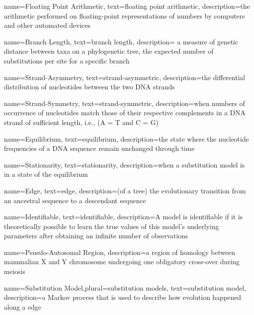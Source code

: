 \makeglossaries

{
        name=Floating Point Arithmetic,
        text=floating point arithmetic,
        description={the arithmetic performed on floating-point representations of numbers by computers and other automated devices}
}


{
        name=Branch Length,
        text=branch length,
        description={ a measure of genetic distance between taxa on a phylogenetic tree, the expected number of substitutions per site for a specific branch}
}


{
        name=Strand-Asymmetry,
        text={strand-asymmetric},
        description={the differential distribution of nucleotides between the two DNA strands}
}

{
        name=Strand-Symmetry,
        text=strand-symmetric,
        description={when numbers of occurrence of nucleotides match those of their respective complements in a DNA strand of sufficient length, i.e., (A = T and C = G)}
}


{
        name=Equilibrium,
        text=equilibrium,
        description={the state where the nucleotide frequencies of a DNA sequence remain unchanged through time}
}

{
        name=Stationarity,
        text=stationarity,
        description={when a substitution model is in a state of the \gls{equilibrium}}
}


{
        name=Edge,
        text=edge,
        description={(of a tree) the evolutionary transition from an ancestral sequence to a descendant sequence}
}

{
        name=Identifiable,
        text=identifiable,
        description={A model is identifiable if it is theoretically possible to learn the true values of this model's underlying parameters after obtaining an infinite number of observations}
}

{
        name=Psuedo-Autosomal Region,
        description={a region of homology between mammalian X and Y chromosome undergoing one obligatory cross-over during meiosis}
}

{
        name={Substitution Model},plural={substitution models},
        text=substitution model,
        description={a Markov process that is used to describe how evolution happened along a edge}
}


